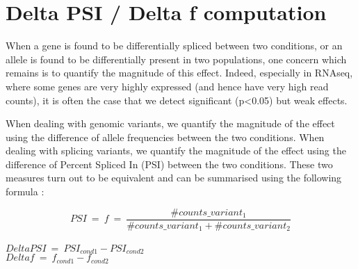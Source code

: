 \documentclass[a4paper,10pt]{article}
\begin{document}
\section{Delta PSI / Delta f computation}
When a gene is found to be differentially spliced between two conditions, or an allele is found to be differentially present in two populations, one concern which remains is to quantify the magnitude of this effect.
Indeed, especially in RNAseq, where some genes are very highly expressed (and hence have very high read counts), it is often the case that we detect significant (p<0.05) but weak effects. 

When dealing with genomic variants, we quantify the magnitude of the effect using the difference of allele frequencies between the two conditions.
When dealing with splicing variants, we quantify the magnitude of the effect using the difference of Percent Spliced In (PSI) between the two conditions.
These two measures turn out to be equivalent and can be summarised using the following formula :

$$PSI \:=\: f  \:=\:  \frac{\#counts\_variant_1}{\#counts\_variant_1 + \#counts\_variant_2} $$ \\
$DeltaPSI \:=\: PSI_{cond1} - PSI_{cond2}$ \\
$Deltaf \:=\: f_{cond1} - f_{cond2}$

\end{document}
